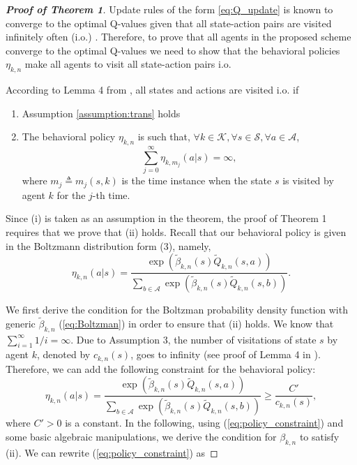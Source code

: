 \documentclass[lettersize,journal]{IEEEtran}
\begin{document}
\begin{appendices}
\begin{proof}[\textbf{Proof of Theorem 1}]
Update rules of the form \eqref{eq:Q_update} is known to converge to the optimal Q-values given that all state-action pairs are visited infinitely often (i.o.) \cite{sayed_2022, Watkins}. Therefore, to prove that all agents in the proposed scheme converge to the optimal Q-values we need to show that the behavioral policies $\eta_{k,n}$ make all agents to visit all state-action pairs i.o. \par 
According to Lemma 4 from \cite{SARSA}, all states and actions are visited i.o. if
\begin{enumerate}[ (i)]
    \item  Assumption \ref{assumption:trans} holds
    \item  The behavioral policy $\eta_{k,n}$ is such that, $\forall k\in \mathcal{K}, \forall s \in \mathcal{S}, \forall a \in \mathcal{A}$,  $$\sum \limits_{j=0}^{\infty}\eta_{k,m_{j}}(a|s)=\infty,$$ where $m_j\triangleq m_j(s,k)$ is the time instance when the state $s$ is visited by agent $k$ for the $j$-th time.
\end{enumerate}

Since (i) is taken as an assumption in the theorem,  the proof of Theorem 1 requires that we prove that (ii) holds. Recall that  our behavioral policy is given in the Boltzmann distribution form (3), namely, 
\begin{equation}
\label{eq:Boltzman}
    \eta_{k,n}\left(a| s\right)=\frac{\exp \left(\widetilde{\beta}_{k,n}(s)\widetilde{Q}_{k,n}(s,a)\right)}{\sum_{b \in \mathcal{A}} \exp \left(\widetilde{\beta}_{k,n}(s) \widetilde{Q}_{k,n}(s,b)\right)}. 
\end{equation}

We first derive the condition for the Boltzman probability density function with  generic $\widetilde{\beta}_{k,n}$ (\ref{eq:Boltzman}) in order to ensure that (ii) holds. We know that  $\sum\limits_{i=1}^{\infty}1/i=\infty$. Due to Assumption 3, the number of visitations of state $s$ by agent $k$, denoted by $c_{k,n}(s)$, goes to infinity (see proof of Lemma 4 in \cite{SARSA}).  Therefore, we can add the following constraint for the behavioral policy:
\begin{equation}
\label{eq:policy_constraint}
    \eta_{k,n}\left(a| s\right)=\frac{\exp \left(\widetilde{\beta}_{k,n}(s)\widetilde{Q}_{k,n}(s,a)\right)}{\sum_{b \in \mathcal{A}} \exp \left(\widetilde{\beta}_{k,n}(s) \widetilde{Q}_{k,n}(s,b)\right)} \geq \frac{C'}{c_{k,n}(s)},
\end{equation}
where $C'>0$ is a constant. In the following, using (\ref{eq:policy_constraint}) and some basic algebraic manipulations, we derive the condition for $\beta_{k,n}$ to satisfy (ii). 
We can  rewrite (\ref{eq:policy_constraint}) as 


\end{proof}
\end{appendices}
\end{document}
